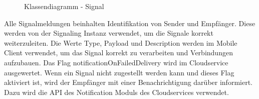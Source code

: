\begin{figure}[h]
    \centering
    \begin{minipage}[b]{0.5\textwidth}
        \caption{Klassendiagramm - Signal}
    \end{minipage}
\end{figure}

Alle Signalmeldungen beinhalten Identifikation von Sender und Empfänger.
Diese werden von der Signaling Instanz verwendet, um die Signale korrekt weiterzuleiten.
Die Werte Type, Payload und Description werden im Mobile Client verwendet, um das Signal korrekt zu verarbeiten und Verbindungen aufzubauen.
Das Flag notificationOnFailedDelivery wird im Cloudservice ausgewertet.
Wenn ein Signal nicht zugestellt werden kann und dieses Flag aktiviert ist, wird der Empfänger mit einer Benachrichtigung darüber informiert.
Dazu wird die API des Notification Moduls des Cloudservices verwendet.

